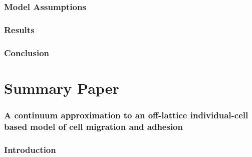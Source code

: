 \documentclass[12pt,letterpaper,cm]{article}
\renewcommand{\.}{\cdot}
\newcommand{\<}{\langle}
\renewcommand{\>}{\rangle}
\begin{document}
	
	
	
	
	\section*{Model Assumptions}
	
	
	
	\section*{Results}	
	
	
	
	\section*{Conclusion}
	
	
	
	\newpage
	
	
	
	
	\part*{Summary Paper}
	\section*{A continuum approximation to an off-lattice individual-cell based model of cell migration and adhesion \cite{Middleton2014} }
	
	
	
%	
%	
%	
%	
%	
%	
%	
%	
%	


	\section{Introduction}
	\indent 
	
\end{document}
